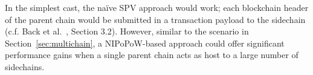 In the simplest cast, the na\"ive SPV approach would work; each blockchain header of the parent chain would be submitted in a transaction payload to the sidechain (c.f. Back et al.~\cite{sidechains}, Section 3.2). However, similar to the scenario in Section~\ref{sec:multichain}, a NIPoPoW-based approach could offer significant performance gains when a single parent chain acts as host to a large number of sidechains. 
